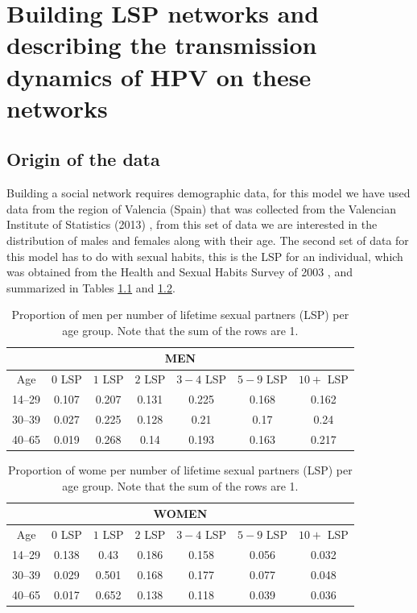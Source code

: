 \chapter{Building LSP networks and describing the transmission dynamics of HPV on these networks}\label{ConstruccionYDinamica}

\section{Origin of the data}

Building a social network requires demographic data, for this model we have used data from the region of Valencia (Spain) that was collected from the Valencian Institute of Statistics (2013) \cite{IVE}, from this set of data we are interested in the distribution of males and females along with their age. The second set of data for this model has to do with sexual habits, this is the LSP for an individual, which was obtained from the Health and Sexual Habits Survey of 2003 \cite{INE}, and summarized in Tables \ref{tableLSPValues_men} and \ref{tableLSPValues_women}. 

\begin{table}[H]
	\centering
	\begin{tabular}{ccccccc}
		\multicolumn{7}{c}{MEN} \\
		\midrule 
		Age & $0$ LSP & $1$ LSP & $2$ LSP & $3-4$ LSP & $5-9$ LSP & $10+$ LSP \\
		\midrule
		14--29 & 0.107 & 0.207 & 0.131 & 0.225 & 0.168 & 0.162 \\
		30--39 & 0.027 & 0.225 & 0.128 & 0.21 & 0.17 & 0.24 \\
		40--65 & 0.019 & 0.268 & 0.14 & 0.193 & 0.163 & 0.217 \\
	\end{tabular} 
	\caption{Proportion of men per number of lifetime sexual partners (LSP) per age group. Note that the sum of the rows are 1.}
	\label{tableLSPValues_men} 
\end{table}

\begin{table}[H]
	\centering
	\begin{tabular}{ccccccc}
		\multicolumn{7}{c}{WOMEN} \\
		\midrule 
		Age & $0$ LSP & $1$ LSP & $2$ LSP & $3-4$ LSP & $5-9$ LSP & $10+$ LSP \\
		\midrule
		14--29 & 0.138 & 0.43 & 0.186 & 0.158 & 0.056 & 0.032 \\
		30--39 & 0.029 & 0.501 & 0.168 & 0.177 & 0.077 & 0.048 \\
		40--65 & 0.017 & 0.652 & 0.138 & 0.118 & 0.039 & 0.036 \\
	\end{tabular} 
	\caption{Proportion of wome per number of lifetime sexual partners (LSP) per age group. Note that the sum of the rows are 1.}
	\label{tableLSPValues_women} 
\end{table}

